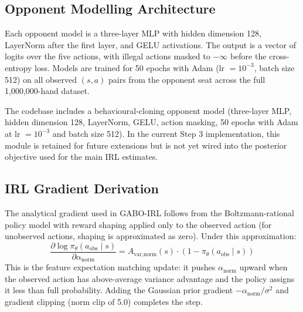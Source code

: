 \documentclass{article}
\begin{document}
\subsection{Opponent Modelling Architecture}
Each opponent model is a three-layer MLP with hidden dimension 128, LayerNorm after the first layer, and GELU activations. The output is a vector of logits over the five actions, with illegal actions masked to $-\infty$ before the cross-entropy loss. Models are trained for 50 epochs with Adam (lr $= 10^{-3}$, batch size 512) on all observed $(s, a)$ pairs from the opponent seat across the full 1,000,000-hand dataset.

The codebase includes a behavioural-cloning opponent model (three-layer MLP, hidden dimension 128, LayerNorm, GELU, action masking, 50 epochs with Adam at lr $=10^{-3}$ and batch size 512). In the current Step 3 implementation, this module is retained for future extensions but is not yet wired into the posterior objective used for the main IRL estimates.

\subsection{IRL Gradient Derivation}
The analytical gradient used in GABO-IRL follows from the Boltzmann-rational policy model with reward shaping applied only to the observed action (for unobserved actions, shaping is approximated as zero). Under this approximation:
\[
\frac{\partial \log \pi_\theta(a_{\text{obs}} \mid s)}{\partial \alpha_{\text{norm}}} = A_{\text{var,norm}}(s) \cdot (1 - \pi_\theta(a_{\text{obs}} \mid s))
\]
This is the feature expectation matching update: it pushes $\alpha_{\text{norm}}$ upward when the observed action has above-average variance advantage and the policy assigns it less than full probability. Adding the Gaussian prior gradient $-\alpha_{\text{norm}} / \sigma^2$ and gradient clipping (norm clip of 5.0) completes the step.
\end{document}
